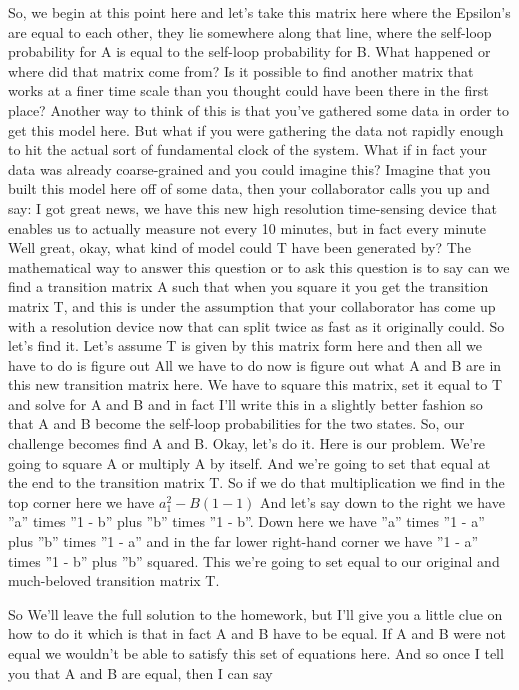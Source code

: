 \documentclass[]{article}
\begin{document}
So, we begin at this point here
and let's take this matrix here where
the Epsilon's are equal to each other,
they lie somewhere along that line,
where the self-loop probability for A
is equal to the self-loop probability for B.
What happened or where
did that matrix come from?
Is it possible to find another matrix
that works at a finer time scale
than you thought could have
been there in the first place?
Another way to think of this is that
you've gathered some data
in order to get this model here.
But what if you were gathering
the data not rapidly enough
to hit the actual sort of fundamental clock of the system.
What if in fact your data was already
coarse-grained and you could imagine this?
Imagine that you built this model
here off of some data,
then your collaborator calls you up
and say: I got great news,
we have this new high resolution
time-sensing device
that enables us to actually measure not
every 10 minutes, but in fact every minute
Well great, okay, what kind of model
could T have been generated by?
The mathematical way to answer this
question or to ask this question
is to say can we find a transition matrix A
such that when you square it you get the transition matrix T,
and this is under the assumption that your collaborator has come up
with a resolution device now that can split
twice as fast as it originally could.
So let's find it. Let's assume T
is given by this matrix form here
and then all we have to do is figure out
All we have to do now is figure out
what A and B are in this new transition matrix here.
We have to square this matrix,
set it equal to T and solve for A and B
and in fact I'll write this
in a slightly better fashion
so that A and B become
the self-loop probabilities
for the two states.
So, our challenge becomes
find A and B.
Okay, let's do it.
Here is our problem. We're going to
square A or multiply A by itself.
And we're going to set that equal
at the end to the transition matrix T.
So if we do that multiplication
we find in the top corner here
we have $a^2_1-B(1-1)$
And let's say down to the right
we have ''a'' times ''1 - b'' plus ''b'' times ''1 - b''.
Down here we have
''a'' times ''1 - a'' plus ''b'' times ''1 - a''
and in the far lower right-hand corner
we have
''1 - a'' times ''1 - b'' plus ''b'' squared.
This we're going to set equal to our original
and much-beloved transition matrix T.

So
We'll leave the full solution
to the homework,
but I'll give you a little clue on how to do it
which is that in fact A and B have to be equal.
If A and B were not equal
we wouldn't be able to satisfy
this set of equations here.
And so once I tell you that A and B
are equal, then I can say
\end{document}

